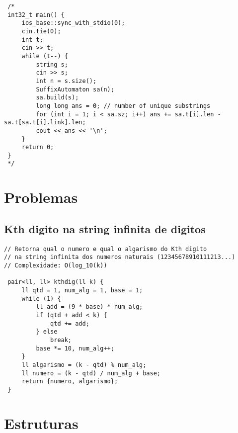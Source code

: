 \documentclass[11pt, a4paper, twoside]{article}
\begin{document}
\begin{lstlisting}
 /*
 int32_t main() {
     ios_base::sync_with_stdio(0);
     cin.tie(0);
     int t;
     cin >> t;
     while (t--) {
         string s;
         cin >> s;
         int n = s.size();
         SuffixAutomaton sa(n);
         sa.build(s);
         long long ans = 0; // number of unique substrings
         for (int i = 1; i < sa.sz; i++) ans += sa.t[i].len - sa.t[sa.t[i].link].len;
         cout << ans << '\n';
     }
     return 0;
 }
 */
\end{lstlisting}

\clearpage


%
%

\section{Problemas}

\subsection{Kth digito na string infinita de digitos}
\begin{lstlisting}
// Retorna qual o numero e qual o algarismo do Kth digito
// na string infinita dos numeros naturais (12345678910111213...)
// Complexidade: O(log_10(k))

 pair<ll, ll> kthdig(ll k) {
     ll qtd = 1, num_alg = 1, base = 1;
     while (1) {
         ll add = (9 * base) * num_alg;
         if (qtd + add < k) {
             qtd += add;
         } else
             break;
         base *= 10, num_alg++;
     }
     ll algarismo = (k - qtd) % num_alg;
     ll numero = (k - qtd) / num_alg + base;
     return {numero, algarismo};
 }
\end{lstlisting}

\clearpage


%
%

\section{Estruturas}
\end{document}
